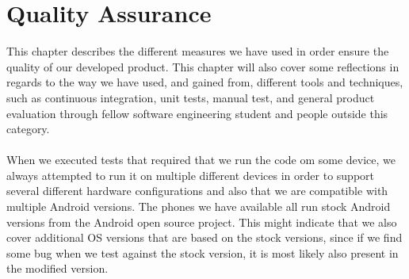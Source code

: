 
\chapter{Quality Assurance}
\label{cha:quality_assurance}

This chapter describes the different measures we have used in order ensure the quality of our developed product. This chapter will also cover some reflections in regards to the way we have used, and gained from, different tools and techniques, such as continuous integration, unit tests, manual test, and general product evaluation through fellow software engineering student and  people outside this category. 
\\\\
When we executed tests that required that we run the code om some device, we always attempted to run it on multiple different devices in order to support several different hardware configurations and also that we are compatible with multiple Android versions. The phones we have available all run stock Android versions from the Android open source project. This might indicate that we also cover additional OS versions that are based on the stock versions, since if we find some bug when we test against the stock version, it is most likely also present in the modified version. 












